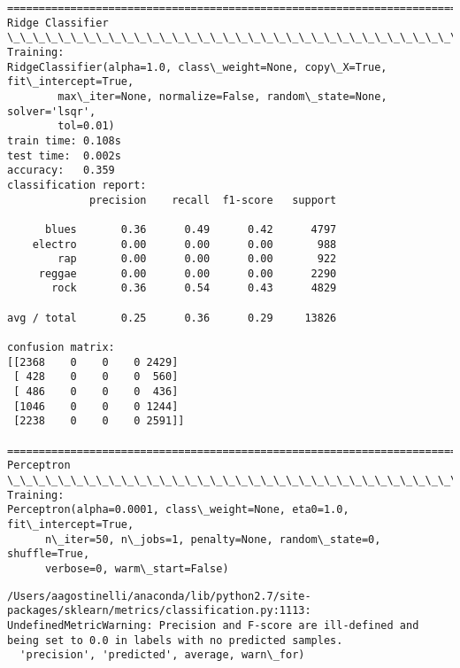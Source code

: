 \documentclass[11pt]{article}
\begin{document}
    \begin{Verbatim}[commandchars=\\\{\}]
================================================================================
Ridge Classifier
\_\_\_\_\_\_\_\_\_\_\_\_\_\_\_\_\_\_\_\_\_\_\_\_\_\_\_\_\_\_\_\_\_\_\_\_\_\_\_\_\_\_\_\_\_\_\_\_\_\_\_\_\_\_\_\_\_\_\_\_\_\_\_\_\_\_\_\_\_\_\_\_\_\_\_\_\_\_\_\_
Training: 
RidgeClassifier(alpha=1.0, class\_weight=None, copy\_X=True, fit\_intercept=True,
        max\_iter=None, normalize=False, random\_state=None, solver='lsqr',
        tol=0.01)
train time: 0.108s
test time:  0.002s
accuracy:   0.359
classification report:
             precision    recall  f1-score   support

      blues       0.36      0.49      0.42      4797
    electro       0.00      0.00      0.00       988
        rap       0.00      0.00      0.00       922
     reggae       0.00      0.00      0.00      2290
       rock       0.36      0.54      0.43      4829

avg / total       0.25      0.36      0.29     13826

confusion matrix:
[[2368    0    0    0 2429]
 [ 428    0    0    0  560]
 [ 486    0    0    0  436]
 [1046    0    0    0 1244]
 [2238    0    0    0 2591]]

================================================================================
Perceptron
\_\_\_\_\_\_\_\_\_\_\_\_\_\_\_\_\_\_\_\_\_\_\_\_\_\_\_\_\_\_\_\_\_\_\_\_\_\_\_\_\_\_\_\_\_\_\_\_\_\_\_\_\_\_\_\_\_\_\_\_\_\_\_\_\_\_\_\_\_\_\_\_\_\_\_\_\_\_\_\_
Training: 
Perceptron(alpha=0.0001, class\_weight=None, eta0=1.0, fit\_intercept=True,
      n\_iter=50, n\_jobs=1, penalty=None, random\_state=0, shuffle=True,
      verbose=0, warm\_start=False)

    \end{Verbatim}

    \begin{Verbatim}[commandchars=\\\{\}]
/Users/aagostinelli/anaconda/lib/python2.7/site-packages/sklearn/metrics/classification.py:1113: UndefinedMetricWarning: Precision and F-score are ill-defined and being set to 0.0 in labels with no predicted samples.
  'precision', 'predicted', average, warn\_for)

    \end{Verbatim}
\end{document}
